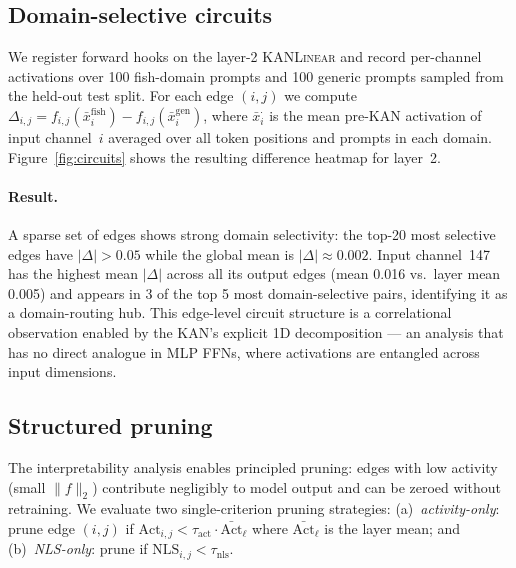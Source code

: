 \documentclass{article}
\newcommand{\kanlinear}{\textsc{KANLinear}}
\begin{document}
\subsection{Domain-selective circuits}
\label{sec:circuits}

We register forward hooks on the layer-2 \kanlinear{} and record per-channel
activations over 100 fish-domain prompts and 100 generic prompts sampled from
the held-out test split.
For each edge $(i,j)$ we compute
$\Delta_{i,j} = f_{i,j}(\bar{x}^{\text{fish}}_i) - f_{i,j}(\bar{x}^{\text{gen}}_i)$,
where $\bar{x}^{\cdot}_i$ is the mean pre-KAN activation of input channel~$i$
averaged over all token positions and prompts in each domain.
Figure~\ref{fig:circuits} shows the resulting difference heatmap for layer~2.

\paragraph{Result.}
A sparse set of edges shows strong domain selectivity: the top-20 most
selective edges have $|\Delta| > 0.05$ while the global mean is $|\Delta| \approx 0.002$.
Input channel~147 has the highest mean $|\Delta|$ across all its output edges
(mean 0.016 vs.\ layer mean 0.005) and appears in 3 of the top 5 most
domain-selective pairs, identifying it as a domain-routing hub.
This edge-level circuit structure is a correlational observation enabled by the
KAN's explicit 1D decomposition --- an analysis that has no direct analogue in
MLP FFNs, where activations are entangled across input dimensions.

\subsection{Structured pruning}

The interpretability analysis enables principled pruning: edges with low
activity (small $\|f\|_2$) contribute negligibly to model output and can be
zeroed without retraining.
We evaluate two single-criterion pruning strategies:
(a)~\emph{activity-only}: prune edge $(i,j)$ if
    $\text{Act}_{i,j} < \tau_\text{act} \cdot \bar{\text{Act}}_\ell$
    where $\bar{\text{Act}}_\ell$ is the layer mean; and
(b)~\emph{NLS-only}: prune if $\text{NLS}_{i,j} < \tau_\text{nls}$.
\end{document}
